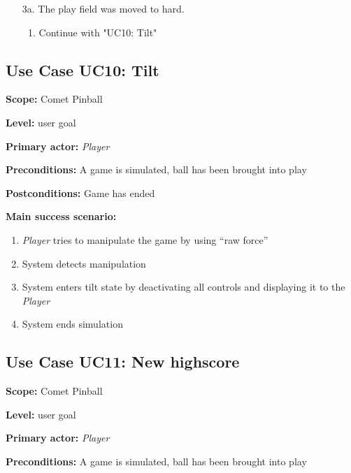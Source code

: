 \documentclass[fontsize=12pt,
               paper=a4,
               twoside=false,
               parskip=half,
               ]{scrartcl}
\begin{document}
\begin{itemize}[leftmargin=3em]
	\item[3a.]  The play field was moved to hard.
	\begin{enumerate}
		\item Continue with "UC10: Tilt"
	\end{enumerate}
\end{itemize}






\subsection{Use Case UC10: Tilt}

\textbf{\textsf{Scope:}} Comet Pinball

\textbf{\textsf{Level:}} user goal

\textbf{\textsf{Primary actor:}} \emph{Player}

\textbf{\textsf{Preconditions:}} A game is simulated, ball has been brought into play

\textbf{\textsf{Postconditions:}} Game has ended

\textbf{\textsf{Main success scenario:}}

\begin{enumerate}[leftmargin=3em]
	\item \emph{Player} tries to manipulate the game by using \enquote{raw force}
	\item System detects manipulation
	\item System enters tilt state by deactivating all controls and displaying it to the \emph{Player}
	\item System ends simulation
\end{enumerate}




\subsection{Use Case UC11: New highscore}

\textbf{\textsf{Scope:}} Comet Pinball

\textbf{\textsf{Level:}} user goal

\textbf{\textsf{Primary actor:}} \emph{Player}

\textbf{\textsf{Preconditions:}} A game is simulated, ball has been brought into play
\end{document}
